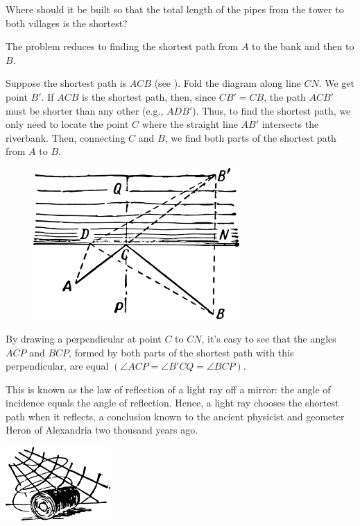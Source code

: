 Where should it be built so that the total length of the pipes from the tower to both villages is the shortest?

\ans The problem reduces to finding the shortest path from $A$ to the bank and then to $B$.

Suppose the shortest path is $ACB$ (see ). Fold the diagram along line $CN$. We get point $B'$. If $ACB$ is the shortest path, then, since $CB' = CB$, the path $ACB'$ must be shorter than any other (e.g., $ADB'$). Thus, to find the shortest path, we only need to locate the point $C$ where the straight line $AB'$ intersects the riverbank. Then, connecting $C$ and $B$, we find both parts of the shortest path from $A$ to $B$.

\begin{figure}%
\centering
\includegraphics[width=0.7\textwidth]{figures/ch-12/fig-192.pdf}
\end{figure}


By drawing a perpendicular at point $C$ to $CN$, it's easy to see that the angles $ACP$ and $BCP$, formed by both parts of the shortest path with this perpendicular, are equal $(\angle ACP = \angle B'CQ = \angle  BCP)$.

This is known as the law of reflection of a light ray off a mirror: the angle of incidence equals the angle of reflection. Hence, a light ray chooses the shortest path when it reflects, a conclusion known to the ancient physicist and geometer Heron of Alexandria two thousand years ago.




\begin{center}
\includegraphics[width=0.3\textwidth]{figures/ch-11/fig-ch-11-tail.pdf}
\end{center}


















